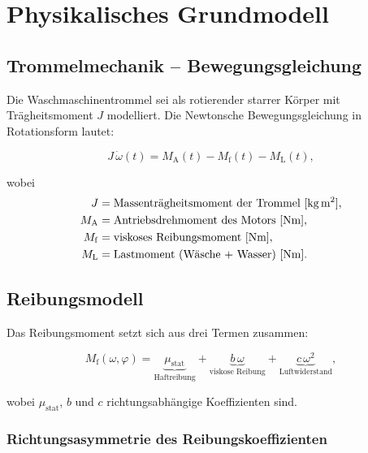 ﻿\documentclass[12pt,a4paper]{article}
\theoremstyle{remark}
\begin{document}
	\section{Physikalisches Grundmodell}
	\label{sec:physik}
	
	\subsection{Trommelmechanik -- Bewegungsgleichung}
	
	Die Waschmaschinentrommel sei als rotierender starrer Körper mit
	Trägheitsmoment $J$ modelliert. Die Newtonsche Bewegungsgleichung in Rotationsform lautet:
	
	\begin{equation}
		J\,\dot{\omega}(t) = M_{\mathrm{A}}(t) - M_{\mathrm{f}}(t) - M_{\mathrm{L}}(t),
		\label{eq:newton}
	\end{equation}
	
	wobei
	\begin{align*}
		J           &= \text{Massenträgheitsmoment der Trommel [kg\,m$^2$]},\\
		M_{\mathrm{A}}   &= \text{Antriebsdrehmoment des Motors [Nm]},\\
		M_{\mathrm{f}}   &= \text{viskoses Reibungsmoment [Nm]},\\
		M_{\mathrm{L}}   &= \text{Lastmoment (Wäsche + Wasser) [Nm]}.
	\end{align*}
	
	\subsection{Reibungsmodell}
	
	Das Reibungsmoment setzt sich aus drei Termen zusammen:
	
	\begin{equation}
		M_{\mathrm{f}}(\omega, \varphi) = \underbrace{\mu_{\mathrm{stat}}}_{\text{Haftreibung}}
		+ \underbrace{b\,\omega}_{\text{viskose Reibung}}
		+ \underbrace{c\,\omega^2}_{\text{Luftwiderstand}},
		\label{eq:reibung}
	\end{equation}
	
	wobei $\mu_{\mathrm{stat}}$, $b$ und $c$ richtungsabhängige Koeffizienten sind.
	
	\subsubsection{Richtungsasymmetrie des Reibungskoeffizienten}
	
\end{document}
